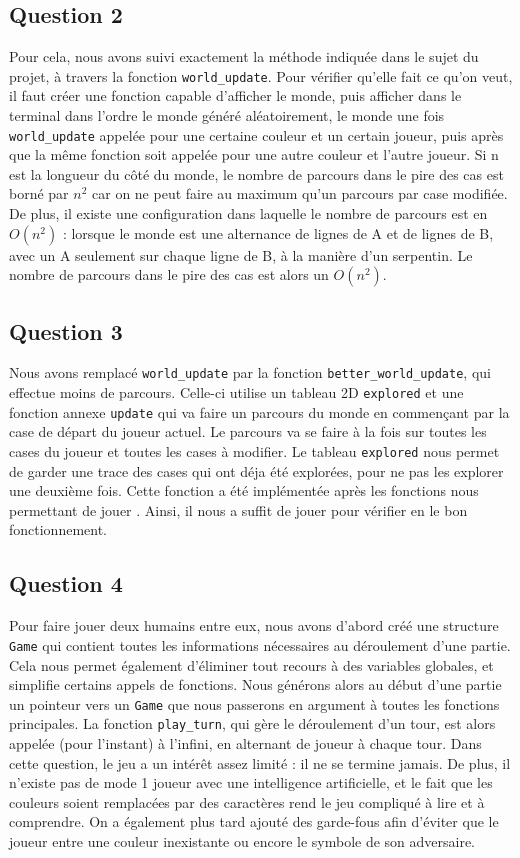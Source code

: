 \documentclass{article}
\begin{document}
\subsection{Question 2}
    Pour cela, nous avons suivi exactement la méthode indiquée dans le sujet du projet, à travers la fonction \texttt{world\_update}. Pour vérifier qu'elle fait ce qu'on veut, il faut créer une fonction capable d'afficher le monde, puis afficher dans le terminal dans l'ordre le monde généré aléatoirement, le monde une fois \texttt{world\_update} appelée pour une certaine couleur et un certain joueur, puis après que la même fonction soit appelée pour une autre couleur et l'autre joueur. 
    Si n est la longueur du côté du monde, le nombre de parcours dans le pire des cas est borné par $n^2$ car on ne peut faire au maximum qu'un parcours par case modifiée. De plus, il existe une configuration dans laquelle le nombre de parcours est en $O(n^2)$ : lorsque le monde est une alternance de lignes de A et de lignes de B, avec un A seulement sur chaque ligne de B, à la manière d'un serpentin. Le nombre de parcours dans le pire des cas est alors un $O(n^2)$.
\subsection{Question 3}
    Nous avons remplacé \texttt{world\_update} par la fonction \texttt{better\_world\_update}, qui effectue moins de parcours. Celle-ci utilise un tableau 2D \texttt{explored} et une fonction annexe \texttt{update} qui va faire un parcours du monde en commençant par la case de départ du joueur actuel. Le parcours va se faire à la fois sur toutes les cases du joueur et toutes les cases à modifier. Le tableau \texttt{explored} nous permet de garder une trace des cases qui ont déja été explorées, pour ne pas les explorer une deuxième fois. Cette fonction a été implémentée après les fonctions nous permettant de jouer . Ainsi, il nous a suffit de jouer pour vérifier en le bon fonctionnement.
\subsection{Question 4}
    Pour faire jouer deux humains entre eux, nous avons d'abord créé une structure \texttt{Game} qui contient toutes les informations nécessaires au déroulement d'une partie. Cela nous permet également d'éliminer tout recours à des variables globales, et simplifie certains appels de fonctions. Nous générons alors au début d'une partie un pointeur vers un \texttt{Game} que nous passerons en argument à toutes les fonctions principales. La fonction \texttt{play\_turn}, qui gère le déroulement d'un tour, est alors appelée (pour l'instant) à l'infini, en alternant de joueur à chaque tour.
    Dans cette question, le jeu a un intérêt assez limité : il ne se termine jamais. De plus, il n'existe pas de mode 1 joueur avec une intelligence artificielle, et le fait que les couleurs soient remplacées par des caractères rend le jeu compliqué à lire et à comprendre. On a également plus tard ajouté des garde-fous afin d'éviter que le joueur entre une couleur inexistante ou encore le symbole de son adversaire.
\end{document}
